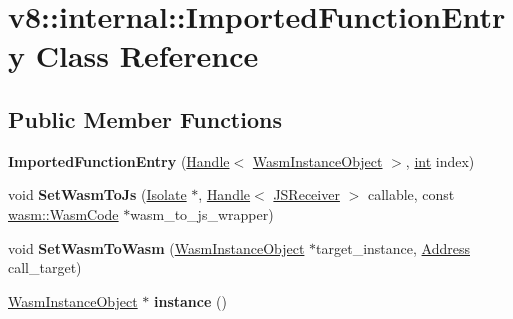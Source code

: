 \hypertarget{classv8_1_1internal_1_1ImportedFunctionEntry}{}\section{v8\+:\+:internal\+:\+:Imported\+Function\+Entry Class Reference}
\label{classv8_1_1internal_1_1ImportedFunctionEntry}
\subsection*{Public Member Functions}
\begin{DoxyCompactItemize}
\item 
\mbox{\label{classv8_1_1internal_1_1ImportedFunctionEntry_a37ba10f59fccc708cc11b0283249a61b}} 
{\bfseries Imported\+Function\+Entry} (\mbox{\hyperlink{classv8_1_1internal_1_1Handle}{Handle}}$<$ \mbox{\hyperlink{classv8_1_1internal_1_1WasmInstanceObject}{Wasm\+Instance\+Object}} $>$, \mbox{\hyperlink{classint}{int}} index)
\item 
\mbox{\label{classv8_1_1internal_1_1ImportedFunctionEntry_a7add4d883ef964d5bd396cad488d339e}} 
void {\bfseries Set\+Wasm\+To\+Js} (\mbox{\hyperlink{classv8_1_1internal_1_1Isolate}{Isolate}} $\ast$, \mbox{\hyperlink{classv8_1_1internal_1_1Handle}{Handle}}$<$ \mbox{\hyperlink{classv8_1_1internal_1_1JSReceiver}{J\+S\+Receiver}} $>$ callable, const \mbox{\hyperlink{classv8_1_1internal_1_1wasm_1_1WasmCode}{wasm\+::\+Wasm\+Code}} $\ast$wasm\+\_\+to\+\_\+js\+\_\+wrapper)
\item 
\mbox{\label{classv8_1_1internal_1_1ImportedFunctionEntry_a91e2ca59472be3f959d3cc0c4553db40}} 
void {\bfseries Set\+Wasm\+To\+Wasm} (\mbox{\hyperlink{classv8_1_1internal_1_1WasmInstanceObject}{Wasm\+Instance\+Object}} $\ast$target\+\_\+instance, \mbox{\hyperlink{classuintptr__t}{Address}} call\+\_\+target)
\item 
\mbox{\label{classv8_1_1internal_1_1ImportedFunctionEntry_a187dbc4366a72d2edc65b4d7118b5a5e}} 
\mbox{\hyperlink{classv8_1_1internal_1_1WasmInstanceObject}{Wasm\+Instance\+Object}} $\ast$ {\bfseries instance} ()
\item 

\end{DoxyCompactItemize}
